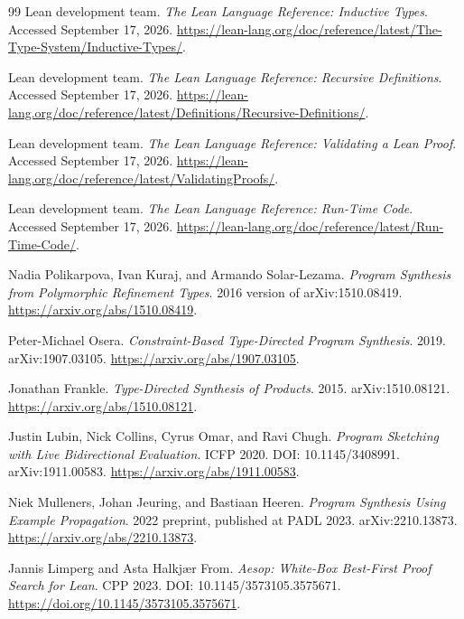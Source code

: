 \begin{thebibliography}{99}
Lean development team.
\emph{The Lean Language Reference: Inductive Types}.
Accessed September 17, 2026.
\url{https://lean-lang.org/doc/reference/latest/The-Type-System/Inductive-Types/}.

Lean development team.
\emph{The Lean Language Reference: Recursive Definitions}.
Accessed September 17, 2026.
\url{https://lean-lang.org/doc/reference/latest/Definitions/Recursive-Definitions/}.

Lean development team.
\emph{The Lean Language Reference: Validating a Lean Proof}.
Accessed September 17, 2026.
\url{https://lean-lang.org/doc/reference/latest/ValidatingProofs/}.

Lean development team.
\emph{The Lean Language Reference: Run-Time Code}.
Accessed September 17, 2026.
\url{https://lean-lang.org/doc/reference/latest/Run-Time-Code/}.

Nadia Polikarpova, Ivan Kuraj, and Armando Solar-Lezama.
\emph{Program Synthesis from Polymorphic Refinement Types}.
2016 version of arXiv:1510.08419.
\url{https://arxiv.org/abs/1510.08419}.

Peter-Michael Osera.
\emph{Constraint-Based Type-Directed Program Synthesis}.
2019. arXiv:1907.03105.
\url{https://arxiv.org/abs/1907.03105}.

Jonathan Frankle.
\emph{Type-Directed Synthesis of Products}.
2015. arXiv:1510.08121.
\url{https://arxiv.org/abs/1510.08121}.

Justin Lubin, Nick Collins, Cyrus Omar, and Ravi Chugh.
\emph{Program Sketching with Live Bidirectional Evaluation}.
ICFP 2020. DOI: 10.1145/3408991. arXiv:1911.00583.
\url{https://arxiv.org/abs/1911.00583}.

Niek Mulleners, Johan Jeuring, and Bastiaan Heeren.
\emph{Program Synthesis Using Example Propagation}.
2022 preprint, published at PADL 2023. arXiv:2210.13873.
\url{https://arxiv.org/abs/2210.13873}.

Jannis Limperg and Asta Halkj\ae r From.
\emph{Aesop: White-Box Best-First Proof Search for Lean}.
CPP 2023. DOI: 10.1145/3573105.3575671.
\url{https://doi.org/10.1145/3573105.3575671}.
\end{thebibliography}
